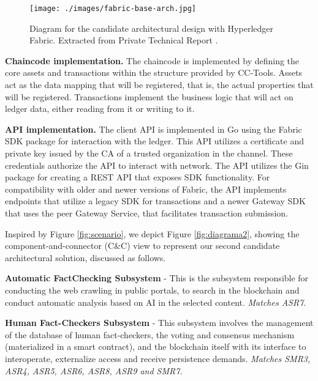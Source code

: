 \begin{figure}[hbt]
  \centering
  \texttt{[image: ./images/fabric-base-arch.jpg]}
  \caption{Diagram for the candidate architectural design with Hyperledger Fabric. Extracted from Private Technical Report \cite{techReport}.}
  \label{fig:diagrama}
\end{figure}

\noindent\textbf{Chaincode implementation.} The chaincode is implemented by defining the core assets and transactions within the structure provided by CC-Tools. Assets act as the data mapping that will be registered, that is, the actual properties that will be registered. Transactions implement the business logic that will act on ledger data, either reading from it or writing to it. %

\noindent\textbf{API implementation.} The client API is implemented in Go using the Fabric SDK package for interaction with the ledger. This API utilizes a certificate and private key issued by the CA of a trusted organization in the channel. These credentials authorize the API to interact with network. The API utilizes the Gin package for creating a REST API that exposes SDK functionality. For compatibility with older and newer versions of Fabric, the API implements endpoints that utilize a legacy SDK for transactions and a newer Gateway SDK that uses the peer Gateway Service, that facilitates transaction submission. 

 Inspired by Figure \ref{fig:scenario}, we depict Figure \ref{fig:diagrama2},  showing the component-and-connector (C\&C) view to represent our second candidate architectural solution, discussed as follows. 

\noindent\textbf{Automatic FactChecking Subsystem} - This is the subsystem responsible for conducting the web crawling in public portals, to search in the blockchain and conduct automatic analysis based on AI in the selected content. \textit{Matches ASR7}.

\noindent\textbf{Human Fact-Checkers Subsystem} - This subsystem involves the management of the database of human fact-checkers, the voting and consensus mechanism (materialized in a smart contract), and the blockchain itself with its interface to interoperate, externalize access and receive persistence demands. \textit{Matches SMR3, ASR4, ASR5, ASR6, ASR8, ASR9 and SMR7}.


